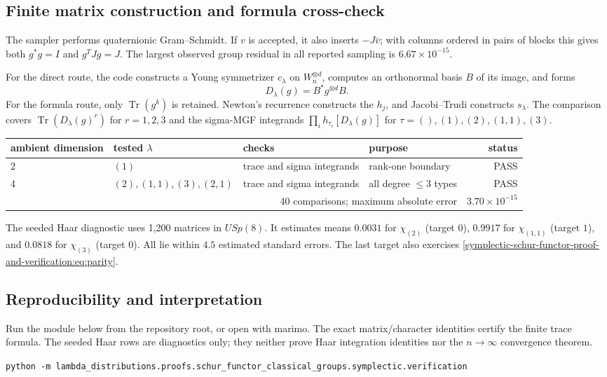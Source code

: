 \documentclass[10pt]{article}
\newcommand{\Tr}{\operatorname{Tr}}
\begin{document}
\subsection{Finite matrix construction and formula cross-check}
The sampler performs quaternionic Gram--Schmidt. If $v$ is accepted, it also inserts $-J\bar v$; with columns ordered in pairs of blocks this gives both $g^*g=I$ and $g^TJg=J$. The largest observed group residual in all reported sampling is $6.67\times10^{-15}$.

For the direct route, the code constructs a Young symmetrizer $c_\lambda$ on $W_n^{\otimes d}$, computes an orthonormal basis $B$ of its image, and forms
\begin{equation}
 D_\lambda(g)=B^*g^{\otimes d}B.
\end{equation}
For the formula route, only $\Tr(g^k)$ is retained. Newton's recurrence constructs the $h_j$, and Jacobi--Trudi constructs $s_\lambda$. The comparison covers $\Tr(D_\lambda(g)^r)$ for $r=1,2,3$ and the sigma-MGF integrands $\prod_i h_{\tau_i}[D_\lambda(g)]$ for $\tau=(),(1),(2),(1,1),(3)$.

\begin{center}\small\begin{tabular}{@{}llllr@{}}\toprule
ambient dimension & tested $\lambda$ & checks & purpose & status\\\midrule
2 & $(1)$ & trace and sigma integrands & rank-one boundary & PASS\\
4 & $(2),(1,1),(3),(2,1)$ & trace and sigma integrands & all degree $\le3$ types & PASS\\\midrule
\multicolumn{4}{r}{40 comparisons; maximum absolute error} & $3.70\times10^{-15}$\\\bottomrule
\end{tabular}\end{center}

The seeded Haar diagnostic uses 1,200 matrices in $USp(8)$. It estimates means $0.0031$ for $\chi_{(2)}$ (target $0$), $0.9917$ for $\chi_{(1,1)}$ (target $1$), and $0.0818$ for $\chi_{(3)}$ (target $0$). All lie within $4.5$ estimated standard errors. The last target also exercises \eqref{symplectic-schur-functor-proof-and-verification:eq:parity}.

\subsection{Reproducibility and interpretation}
Run the module below from the repository root, or open  with marimo. The exact matrix/character identities certify the finite trace formula.  The seeded Haar rows are diagnostics only; they neither prove Haar integration identities nor the $n\to\infty$ convergence theorem.
\begin{center}\footnotesize\texttt{python -m lambda\_distributions.proofs.schur\_functor\_classical\_groups.symplectic.verification}\end{center}
\end{document}
